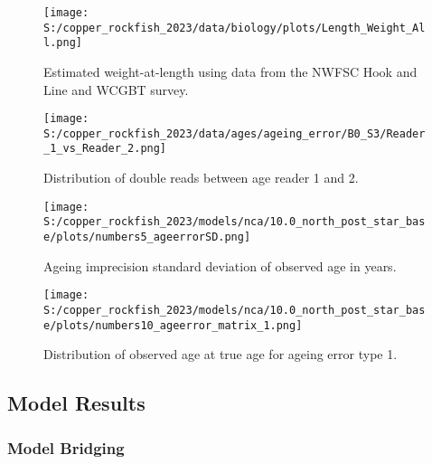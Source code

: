 \documentclass[11pt,
  letterpaper,
]{article}
\begin{document}
\pagebreak

\begin{figure}
{\centering
\texttt{[image: S:/copper\_rockfish\_2023/data/biology/plots/Length\_Weight\_All.png]}
}
\caption{Estimated weight-at-length using data from the NWFSC Hook and Line and WCGBT survey.\label{fig:weight-length}}
\end{figure}

\pagebreak

\begin{figure}
{\centering
\texttt{[image: S:/copper\_rockfish\_2023/data/ages/ageing\_error/B0\_S3/Reader\_1\_vs\_Reader\_2.png]}
}
\caption{Distribution of double reads between age reader 1 and 2.\label{fig:age-error-dist}}
\end{figure}

\pagebreak

\begin{figure}
{\centering
\texttt{[image: S:/copper\_rockfish\_2023/models/nca/10.0\_north\_post\_star\_base/plots/numbers5\_ageerrorSD.png]}
}
\caption{Ageing imprecision standard deviation of observed age in years.\label{fig:age-error}}
\end{figure}

\pagebreak

\begin{figure}
{\centering
\texttt{[image: S:/copper\_rockfish\_2023/models/nca/10.0\_north\_post\_star\_base/plots/numbers10\_ageerror\_matrix\_1.png]}
}
\caption{Distribution of observed age at true age for ageing error type 1.\label{fig:age-error-matrix}}
\end{figure}

\pagebreak

\subsection{Model Results}\label{model-results}

\subsubsection{Model Bridging}\label{model-bridging}
\end{document}
